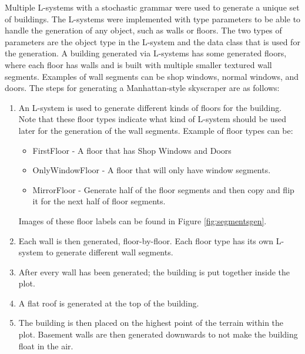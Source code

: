 Multiple L-systems with a stochastic grammar were used to generate a unique set of buildings. 
The L-systems were implemented with type parameters to be able to handle the generation of any object, such as walls or floors.
The two types of parameters are the object type in the L-system and the data class that is used for the generation.
A building generated via L-systems has some generated floors, where each floor has walls and is built with multiple smaller textured wall segments. 
Examples of wall segments can be shop windows, normal windows, and doors.
The steps for generating a Manhattan-style skyscraper are as follows:
\begin{enumerate}
    \item An L-system is used to generate different kinds of floors for the building. Note that these floor types indicate what kind of L-system should be used later for the generation of the wall segments. Example of floor types can be:
    \begin{itemize}
        \item FirstFloor - A floor that has Shop Windows and Doors
        \item OnlyWindowFloor - A floor that will only have window segments. 
        \item MirrorFloor - Generate half of the floor segments and then copy and flip it for the next half of floor segments.
    \end{itemize}
    Images of these floor labels can be found in Figure \ref{fig:segmentsgen}.
    \item Each wall is then generated, floor-by-floor. Each floor type has its own L-system to generate different wall segments.
    \item After every wall has been generated; the building is put together inside the plot.
    \item A flat roof is generated at the top of the building.
    \item The building is then placed on the highest point of the terrain within the plot. Basement walls are then generated downwards to not make the building float in the air. %
\end{enumerate}



